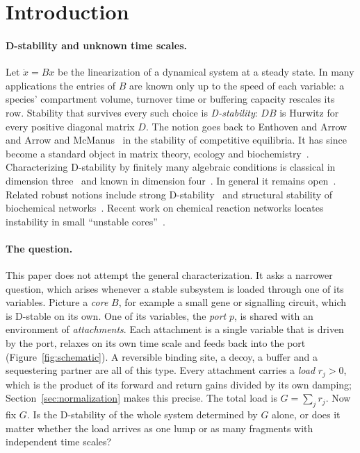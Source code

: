 \documentclass[11pt,a4paper]{article}
\theoremstyle{plain}
\theoremstyle{definition}
\theoremstyle{remark}
\begin{document}
\tableofcontents

\section{Introduction}\label{sec:intro}

\paragraph{D-stability and unknown time scales.}
Let $\dot x=Bx$ be the linearization of a dynamical system at a steady state.
In many applications the entries of $B$ are known only up to the speed of each
variable: a species' compartment volume, turnover time or buffering capacity
rescales its row. Stability that survives every such choice is
\emph{D-stability}: $DB$ is Hurwitz for every positive diagonal matrix $D$.
The notion goes back to Enthoven and Arrow~\cite{enthoven1956} and Arrow and
McManus~\cite{arrow1958} in the stability of competitive equilibria. It has
since become a standard object in matrix theory, ecology and
biochemistry~\cite{johnson1974,cross1978,berman1983,hershkowitz1992,logofet1993,hornjohnson1991,kushel2019}.
Characterizing D-stability by finitely many algebraic conditions is classical
in dimension three~\cite{cain1976} and known in dimension
four~\cite{kanovei1998,impram2005}. In general it remains
open~\cite{kushel2019,kushel2026}. Related robust notions include strong
D-stability~\cite{abed1986} and structural stability of biochemical
networks~\cite{blanchini2014}. Recent work on chemical reaction networks
locates instability in small ``unstable cores''~\cite{vassena2024}.

\paragraph{The question.}
This paper does not attempt the general characterization. It asks a narrower
question, which arises whenever a stable subsystem is loaded through one of its
variables. Picture a \emph{core} $B$, for example a small gene or signalling
circuit, which is D-stable on its own. One of its variables, the \emph{port}
$p$, is shared with an environment of \emph{attachments}. Each attachment is
a single variable that is driven by the port, relaxes on its own time scale
and feeds back into the port (Figure~\ref{fig:schematic}). A reversible binding
site, a decoy, a buffer and a sequestering partner are all of this type. Every
attachment carries a \emph{load} $r_j>0$, which is the product of its forward
and return gains divided by its own damping; Section~\ref{sec:normalization}
makes this precise. The total load is $G=\sum_jr_j$. Now fix $G$. Is the
D-stability of the whole system determined by $G$ alone, or does it matter
whether the load arrives as one lump or as many fragments with independent
time scales?
\end{document}
